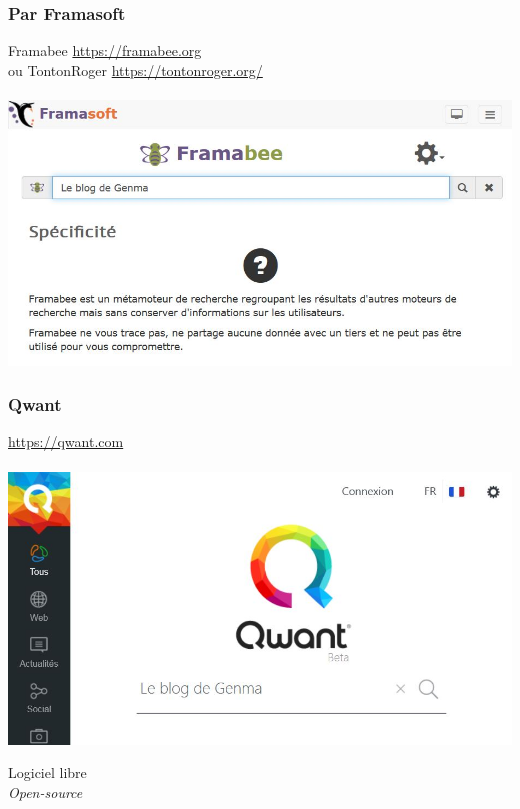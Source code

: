 \documentclass{beamer}
\begin{document}
\begin{frame}
\begin{center}
\frametitle{Par Framasoft}

Framabee \url{https://framabee.org} \\ou TontonRoger \url{https://tontonroger.org/}
\\~\\
\includegraphics[scale=0.6] {./images/Framabee.jpg}
\end{center}
\end{frame}

\begin{frame}
\begin{center}
\frametitle{Qwant}

\url{https://qwant.com}
\\~\\
\includegraphics[scale=0.6] {./images/Qwant.jpg}
\end{center}
\end{frame}

\begin{frame}
\begin{center}
\Huge {Logiciel libre
\\ \emph{Open-source}
}
\end{center}
\end{frame}
\end{document}
